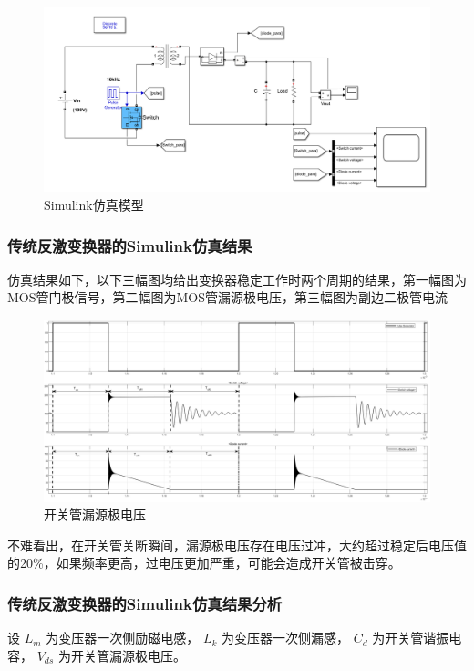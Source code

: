 \documentclass[UTF8]{ctexart}
\numberwithin{equation}{section}
\begin{document}
	\begin{figure}[h]
		\centering
		\includegraphics[scale=0.36]{image/tranditional_flyback.png}
		\caption{Simulink仿真模型}
	\end{figure}
	\subsubsection{传统反激变换器的Simulink仿真结果}
	仿真结果如下，以下三幅图均给出变换器稳定工作时两个周期的结果，第一幅图为MOS管门极信号，第二幅图为MOS管漏源极电压，第三幅图为副边二极管电流
	
	\begin{figure}[h]
		\centering
		\includegraphics[scale=0.2]{image/scope.png}
		\caption{开关管漏源极电压}
	\end{figure}

	不难看出，在开关管关断瞬间，漏源极电压存在电压过冲，大约超过稳定后电压值的20\%，如果频率更高，过电压更加严重，可能会造成开关管被击穿。
	
	\subsubsection{传统反激变换器的Simulink仿真结果分析}
	设 $L_m$ 为变压器一次侧励磁电感， $L_k$ 为变压器一次侧漏感， $C_d$ 为开关管谐振电容， $V_{ds}$ 为开关管漏源极电压。
	
\end{document}
